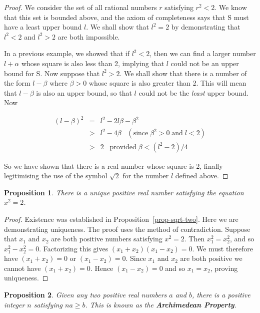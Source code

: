 \documentclass[12pt]{scrbook}
\newtheorem{proposition}{Proposition}[section]
\begin{document}
\begin{proof}
We consider the set of all rational numbers $r$ satisfying $r^2 < 2$.  We know that this set is bounded above, and the axiom of completeness says that S must have a least upper bound $l$.  We shall show that $l^2 = 2$ by demonstrating that $l^2 < 2$ and $l^2 > 2$ are both impossible.

In a previous example, we showed that if $l^2 < 2$, then we can find a larger number $l + \alpha$ whose square is also less than 2, implying that $l$ could not be an upper bound for S.  Now suppose that $l^2 > 2$.  We shall show that there is a number of the form $l - \beta$ where $\beta > 0$ whose square is also greater than 2.  This will mean that  $l - \beta$ is also an upper bound, so that $l$ could not be the {\em least} upper bound. Now

	\begin{eqnarray*}
	(l  - \beta)^2 	&=& l^2 - 2 l \beta - \beta^2 \\
				&>& l^2 - 4 \beta \;\;\; (\text{since} \; \beta^2 > 0 \; \text{and} \; l < 2) \\
				&>&  2 \;\;\;  \text{provided} \; \beta < (l^2 - 2)/4
	\end{eqnarray*}
	
So we have shown that there is a real number whose square is 2, finally legitimising the use of the symbol $\sqrt{2}$ for the number $l$ defined above.
\end{proof}

\begin{proposition}
There is a unique positive real number satisfying the equation $x^2 = 2$.
\end{proposition}

\begin{proof}
Existence was established in Proposition~\ref{prop-sqrt-two}.  Here we are demonstrating uniqueness.  The proof uses the method of contradiction.  Suppose that $x_1$ and $x_2$ are both positive numbers satisfying $x^2 = 2$.  Then $x_1^2 = x_2^2$, and so $x_1^2 - x_2^2 = 0$.  Factorizing this gives $(x_1 + x_2)(x_1 - x_2) = 0$.  We must therefore have $(x_1 + x_2) = 0$ or $(x_1 - x_2) = 0$. Since $x_1$ and $x_2$ are both positive we cannot have $(x_1 + x_2) = 0$.  Hence $(x_1 - x_2) = 0$ and so $x_1 = x_2$, proving uniqueness.
\end{proof}

\begin{proposition}
Given any two positive real numbers $a$ and $b$, there is a positive integer $n$ satisfying $na \geq b$.  This is known as the {\bf Archimedean Property}.
\end{proposition}
\end{document}
